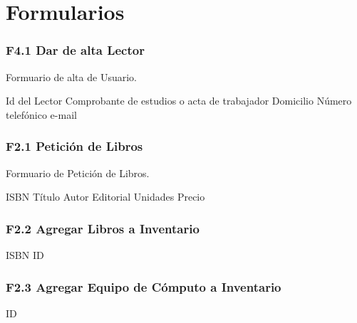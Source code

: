 \chapter{Formularios}
\label{appendix:Formularios}

\subsection{F4.1 Dar de alta Lector }
  Formuario de alta de Usuario.\\

	\begin{UClist}
      \UCli Id del Lector
      \UCli Comprobante de estudios o acta de trabajador
      \UCli Domicilio
      \UCli Número telefónico
      \UCli e-mail
    \end{UClist}




\subsection{F2.1 Petición de Libros}
Formuario de Petición de Libros.\\

\begin{UClist}
	\UCli ISBN
	\UCli Título
	\UCli Autor
	\UCli Editorial
	\UCli Unidades
	\UCli Precio
\end{UClist}


\subsection{F2.2 Agregar Libros a Inventario}

\begin{UClist}
	\UCli ISBN
	\UCli ID
\end{UClist}


\subsection{F2.3 Agregar Equipo de Cómputo a Inventario}

\begin{UClist}
	\UCli ID
\end{UClist}


